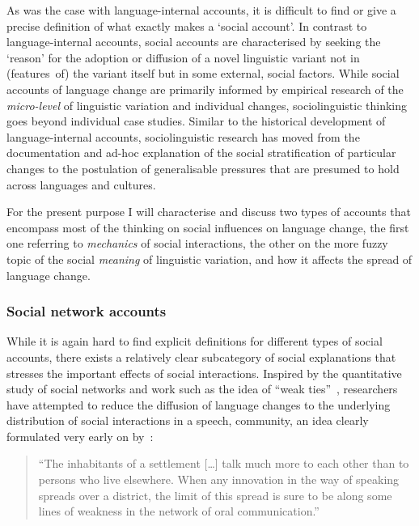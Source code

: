 As was the case with language-internal accounts, it is difficult to find or give a precise definition of what exactly makes a `social account'. In contrast to language-internal accounts, social accounts are characterised by seeking the `reason' for the adoption or diffusion of a novel linguistic variant not in (features~of) the variant itself but in some external, social factors.
While social accounts of language change are primarily informed by empirical research of the \emph{micro-level} of linguistic variation and individual changes, sociolinguistic thinking goes beyond individual case studies.
Similar to the historical development of language-internal accounts, sociolinguistic research %
has moved from the documentation and ad-hoc explanation of the social stratification of particular changes to the postulation of generalisable pressures that are presumed to hold across languages and cultures.

For the present purpose I will characterise and discuss two types of accounts that encompass most of the thinking on social influences on language change, the first one referring to \emph{mechanics} of social interactions, the other on the more fuzzy topic of the social \emph{meaning} of linguistic variation, and how it affects the spread of language change.

\subsubsection{Social network accounts}
\label{sec:interactorselection}

While it is again hard to find explicit definitions for different types of social accounts, there exists a relatively clear subcategory of social explanations that stresses the important effects of social interactions. 
Inspired by the quantitative study of social networks and work such as the idea of ``weak ties''~\citep{Granovetter1973}, researchers have attempted to reduce the diffusion of language changes to the underlying distribution of social interactions in a speech, community, an idea clearly formulated very early on by~\citet[p.476]{Bloomfield1933}:

\begin{quote}
``The inhabitants of a settlement [\ldots] talk much more to each other than to persons who live elsewhere. When any innovation in the way of speaking spreads over a district, the limit of this spread is sure to be along some lines of weakness in the network of oral communication.''
\end{quote}

